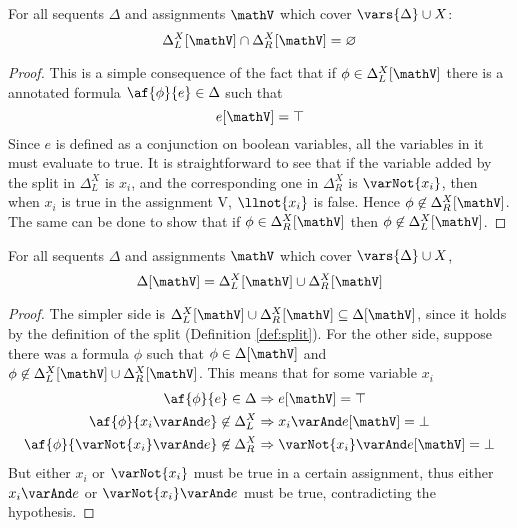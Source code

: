 \begin{lemma}
	\label{lemma:cap}
	For all sequents $\Delta$ and assignments $\mathV$ which cover $\vars{\Delta} \cup X$:
	$$ \Delta_L^X[\mathV] \cap \Delta_R^X[\mathV] = \varnothing $$
\end{lemma}
\begin{proof}
	This is a simple consequence of the fact that if $\phi \in \Delta_L^X[\mathV]$ there is a annotated formula $\af{\phi}{e} \in \Delta$ such that 
	$$ e[\mathV] = \top $$
	Since $e$ is defined as a conjunction on boolean variables, all the variables in it must evaluate to true.
	It is straightforward to see that if the variable added by the split in $\Delta_L^X$ is $x_i$, and the corresponding one in $\Delta_R^X$ is $\varNot{x_i}$, then when $x_i$ is true in the assignment V, $\llnot{x_i}$ is false.
	Hence $\phi \not \in \Delta_R^X[\mathV]$.
	The same can be done to show that if $\phi \in \Delta_R^X[\mathV]$ then $\phi \not \in \Delta_L^X[\mathV]$.
\end{proof}

\begin{lemma}
	\label{lemma:cup}
	For all sequents $\Delta$ and assignments $\mathV$ which cover $\vars{\Delta} \cup X$,
	$$ \Delta[\mathV] = \Delta_L^X[\mathV] \cup \Delta_R^X[\mathV] $$
\end{lemma}
\begin{proof}
	The simpler side is $\Delta_L^X[\mathV] \cup \Delta_R^X[\mathV] \subseteq \Delta[\mathV]$, since it  holds by the definition of the split (Definition \ref{def:split}).
	For the other side, suppose there was a formula $\phi$ such that $\phi \in \Delta[\mathV]$ and $\phi \not \in \Delta_L^X[\mathV] \cup \Delta_R^X[\mathV]$.
	This means that for some variable $x_i$ 
	\begin{align*}
		\af{\phi}{e} \in \Delta &\Rightarrow e[\mathV] = \top \\
		\af{\phi}{x_i \varAnd e} \not \in \Delta_L^X &\Rightarrow x_i \varAnd e[\mathV] = \bot \\
		\af{\phi}{\varNot{x_i} \varAnd e} \not \in \Delta_R^X &\Rightarrow \varNot{x_i} \varAnd e[\mathV] = \bot
	\end{align*}
	But either $x_i$ or $\varNot{x_i}$ must be true in a certain assignment, thus either $x_i \varAnd e$ or $\varNot{x_i} \varAnd e$ must be true, contradicting the hypothesis.
\end{proof}

